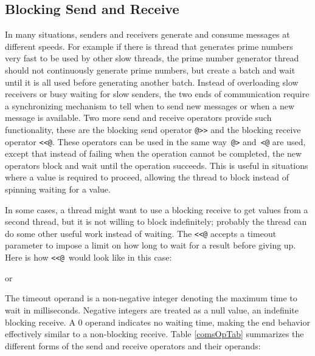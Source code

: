\subsection{Blocking Send and Receive}
In many situations, senders and receivers generate and consume messages at
different speeds. For example if there is thread that generates prime
numbers very fast to be used by other slow threads, the prime number
generator thread should not continuously generate prime numbers, but create
a batch and wait until it is all used before generating another
batch. Instead of overloading slow receivers or busy waiting for slow
senders, the two ends of communication require a synchronizing mechanism to
tell when to send new messages or when a new message is available. Two more
send and receive operators provide such functionality, these are the
blocking send operator \texttt{@>{}>} and the blocking receive operator
\texttt{<{}<@}. These operators can be used in the same way\texttt{ @>}
and\texttt{ <@} are used, except that instead of failing when the operation
cannot be completed, the new operators block and wait until the operation
succeeds. This is useful in situations where a value is required to
proceed, allowing the thread to block instead of spinning waiting for a
value.

In some cases, a thread might want to use a blocking receive to get values from
a second thread, but it is not willing to block indefinitely; probably the thread
can do some other useful work instead of waiting. The \texttt{<{}<@}  accepts a timeout parameter
to impose a limit on how long to wait for a result before giving up. Here is how
\texttt{<{}<@ }would look like in this case:

\noindent or

The timeout operand is a non-negative integer denoting the maximum time to
wait in milliseconds. Negative integers are treated as a null value, an
indefinite blocking receive. A 0 operand indicates no waiting time, making
the end behavior effectively similar to a non-blocking receive. Table \ref{comsOpTab}
summarizes the different forms of the send and receive operators and their
operands:

